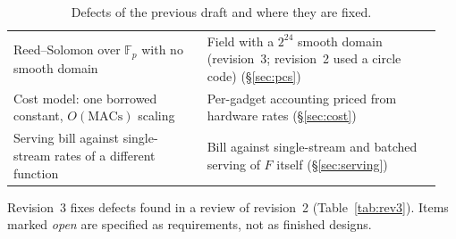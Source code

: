\documentclass[11pt]{article}
\newcommand{\F}{\mathbb{F}}
\newcommand{\Fp}{\F_p}
\begin{document}
\begin{table}[h]
\begin{tabular}{@{}p{0.43\linewidth}p{0.52\linewidth}@{}}
Reed--Solomon over \(\Fp\) with no smooth domain & Field with a \(2^{24}\) smooth domain (revision~3; revision~2 used a circle code) (\S\ref{sec:pcs}) \\
Cost model: one borrowed constant, \(O(\text{MACs})\) scaling & Per-gadget accounting priced from hardware rates (\S\ref{sec:cost}) \\
Serving bill against single-stream rates of a different function & Bill against single-stream and batched serving of \(F\) itself (\S\ref{sec:serving}) \\
\bottomrule
\end{tabular}
\caption{Defects of the previous draft and where they are fixed.}
\label{tab:changes}
\end{table}

Revision~3 fixes defects found in a review of revision~2 (Table~\ref{tab:rev3}).
Items marked \emph{open} are specified as requirements, not as finished designs.
\end{document}
